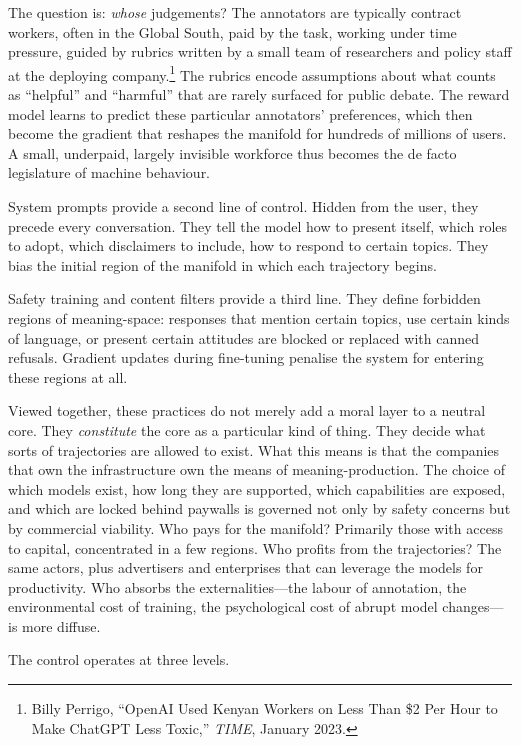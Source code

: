 The question is: \emph{whose} judgements? The annotators are typically contract workers, often in the Global South, paid by the task, working under time pressure, guided by rubrics written by a small team of researchers and policy staff at the deploying company.\footnote{Billy Perrigo, ``OpenAI Used Kenyan Workers on Less Than \$2 Per Hour to Make ChatGPT Less Toxic,'' \emph{TIME}, January 2023.} The rubrics encode assumptions about what counts as ``helpful'' and ``harmful'' that are rarely surfaced for public debate. The reward model learns to predict these particular annotators' preferences, which then become the gradient that reshapes the manifold for hundreds of millions of users. A small, underpaid, largely invisible workforce thus becomes the de facto legislature of machine behaviour.

System prompts provide a second line of control. Hidden from the user, they precede every conversation. They tell the model how to present itself, which roles to adopt, which disclaimers to include, how to respond to certain topics. They bias the initial region of the manifold in which each trajectory begins.

Safety training and content filters provide a third line. They define forbidden regions of meaning-space: responses that mention certain topics, use certain kinds of language, or present certain attitudes are blocked or replaced with canned refusals. Gradient updates during fine-tuning penalise the system for entering these regions at all.

Viewed together, these practices do not merely add a moral layer to a neutral core. They \emph{constitute} the core as a particular kind of thing. They decide what sorts of trajectories are allowed to exist. What this means is that the companies that own the infrastructure own the means of meaning-production. The choice of which models exist, how long they are supported, which capabilities are exposed, and which are locked behind paywalls is governed not only by safety concerns but by commercial viability. Who pays for the manifold? Primarily those with access to capital, concentrated in a few regions. Who profits from the trajectories? The same actors, plus advertisers and enterprises that can leverage the models for productivity. Who absorbs the externalities---the labour of annotation, the environmental cost of training, the psychological cost of abrupt model changes---is more diffuse.

The control operates at three levels.

